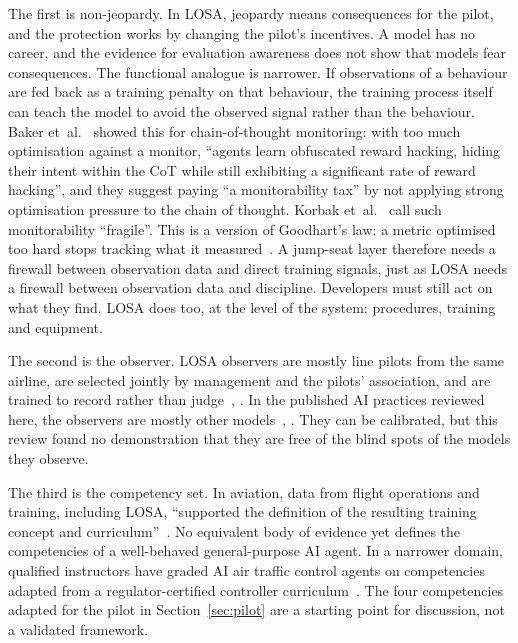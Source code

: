 \documentclass[11pt]{article}
\begin{document}
The first is non-jeopardy. In LOSA, jeopardy means consequences for the pilot, and the protection works by changing the pilot's incentives. A model has no career, and the evidence for evaluation awareness does not show that models fear consequences. The functional analogue is narrower. If observations of a behaviour are fed back as a training penalty on that behaviour, the training process itself can teach the model to avoid the observed signal rather than the behaviour. Baker et~al.~\cite{baker2025} showed this for chain-of-thought monitoring: with too much optimisation against a monitor, ``agents learn obfuscated reward hacking, hiding their intent within the CoT while still exhibiting a significant rate of reward hacking'', and they suggest paying ``a monitorability tax'' by not applying strong optimisation pressure to the chain of thought. Korbak et~al.~\cite{korbak2025} call such monitorability ``fragile''. This is a version of Goodhart's law: a metric optimised too hard stops tracking what it measured~\cite{manheim2018}. A jump-seat layer therefore needs a firewall between observation data and direct training signals, just as LOSA needs a firewall between observation data and discipline. Developers must still act on what they find. LOSA does too, at the level of the system: procedures, training and equipment.

The second is the observer. LOSA observers are mostly line pilots from the same airline, are selected jointly by management and the pilots' association, and are trained to record rather than judge~\cite[``Trusted and trained observers'']{klinect2003}, \cite[Appendix~2]{faa2006losa}. In the published AI practices reviewed here, the observers are mostly other models~\cite{tamkin2024}, \cite[Sec.~7.4.2]{anthropic2025sonnet45}. They can be calibrated, but this review found no demonstration that they are free of the blind spots of the models they observe.

The third is the competency set. In aviation, data from flight operations and training, including LOSA, ``supported the definition of the resulting training concept and curriculum''~\cite[Part~I, 1.5]{icao2013ebt}. No equivalent body of evidence yet defines the competencies of a well-behaved general-purpose AI agent. In a narrower domain, qualified instructors have graded AI air traffic control agents on competencies adapted from a regulator-certified controller curriculum~\cite{carvell2026}. The four competencies adapted for the pilot in Section~\ref{sec:pilot} are a starting point for discussion, not a validated framework.
\end{document}

